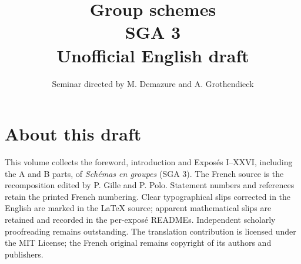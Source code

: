 \documentclass[11pt,a4paper,oneside]{amsbook}
\title[SGA 3 (English draft)]{Group schemes\\
{\normalsize SGA 3\\Unofficial English draft}}
\author{Seminar directed by M. Demazure and A. Grothendieck}
\date{}
\begin{document}
\frontmatter
\maketitle
\chapter*{About this draft}
This volume collects the foreword, introduction and Expos\'es I--XXVI,
including the A and B parts, of \textit{Sch\'emas en groupes} (SGA 3).
The French source is the recomposition edited by P. Gille and P. Polo.
Statement numbers and references retain the printed French numbering.
Clear typographical slips corrected in the English are marked in the
LaTeX source; apparent mathematical slips are retained and recorded in
the per-expos\'e READMEs. Independent scholarly proofreading remains outstanding.
The translation contribution is licensed under the MIT License;
the French original remains copyright of its authors and publishers.
\begingroup\small
\tableofcontents
\endgroup
\end{document}
